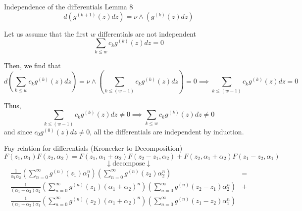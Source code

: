 \documentclass[11pt,aspectratio=169]{beamer}
\begin{document}
\begin{frame}{Independence of the differentials}{\tiny \cite{BL13} Lemma 8}
    \[d(g^{(k+1)}(z)dz) = \nu \wedge (g^{(k)}(z)dz)\]

    Let us assume that the first $w$ differentials are not independent
    \[\sum_{k\leq w} c_{k} g^{(k)}(z) dz = 0\]

    Then, we find that
    \[ d\left(\sum_{k\leq w} c_{k} g^{(k)}(z) dz\right) = \nu \wedge \left(\sum_{k\leq (w-1)} c_{k} g^{(k)}(z) dz\right) = 0 \implies \sum_{k\leq (w-1)} c_{k} g^{(k)}(z) dz = 0 \]

    Thus,
    \[\sum_{k\leq (w-1)} c_{k} g^{(k)}(z) dz \neq 0 \implies \sum_{k\leq w} c_{k} g^{(k)}(z) dz \neq 0\]
    and since $c_0 g^{(0)}(z) dz \neq 0$, all the differentials are independent by induction.
\end{frame}

\begin{frame}{Fay relation for differentials (Kronecker to Decomposition)}
    \[F(z_1,\alpha_1)F(z_2,\alpha_2) = F(z_1,\alpha_1+\alpha_2)F(z_2-z_1,\alpha_2)+F(z_2,\alpha_1+\alpha_2)F(z_1-z_2,\alpha_1)\]
    \[\downarrow \text{decompose} \downarrow\]
    \begin{align*}
        \frac{1}{\alpha_1 \alpha_2}\left(\sum_{n=0}^\infty g^{(n)}(z_1) \alpha_1^n\right)\left(\sum_{n=0}^\infty g^{(n)}(z_2) \alpha_2^n\right)& = \\
        \frac{1}{(\alpha_1+\alpha_2)\alpha_2}\left(\sum_{n=0}^\infty g^{(n)}(z_1) (\alpha_1+\alpha_2)^n\right)\left(\sum_{n=0}^\infty g^{(n)}(z_2-z_1) \alpha_2^n\right)& + \\
        \frac{1}{(\alpha_1+\alpha_2)\alpha_1}\left(\sum_{n=0}^\infty g^{(n)}(z_2) (\alpha_1+\alpha_2)^n\right)\left(\sum_{n=0}^\infty g^{(n)}(z_1-z_2) \alpha_1^n\right)&
    \end{align*}
    
\end{frame}
\end{document}

